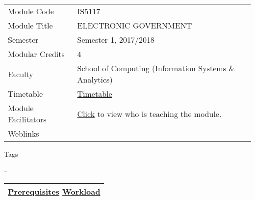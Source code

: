 \hypertarget{ctl00_ctl00_ContentPlaceHolder1_ContentPlaceHolder1_LV_itemPlaceholderContainer}{}
\begin{longtable}[]{@{}ll@{}}
\toprule
\protect\hypertarget{ctl00_ctl00_ContentPlaceHolder1_ContentPlaceHolder1_LV_ctrl0_txtCode}{}{Module
Code} &
\protect\hypertarget{ctl00_ctl00_ContentPlaceHolder1_ContentPlaceHolder1_LV_ctrl0_lcCode}{}{IS5117}\tabularnewline
\protect\hypertarget{ctl00_ctl00_ContentPlaceHolder1_ContentPlaceHolder1_LV_ctrl0_lcCourse}{}{Module
Title} &
\protect\hypertarget{ctl00_ctl00_ContentPlaceHolder1_ContentPlaceHolder1_LV_ctrl0_lcCourseName}{}{ELECTRONIC
GOVERNMENT}\tabularnewline
\protect\hypertarget{ctl00_ctl00_ContentPlaceHolder1_ContentPlaceHolder1_LV_ctrl0_lcSemester}{}{Semester}
&
\protect\hypertarget{ctl00_ctl00_ContentPlaceHolder1_ContentPlaceHolder1_LV_ctrl0_lcSem}{}{Semester
1, 2017/2018}\tabularnewline
\protect\hypertarget{ctl00_ctl00_ContentPlaceHolder1_ContentPlaceHolder1_LV_ctrl0_lcModCredit}{}{Modular
Credits} &
\protect\hypertarget{ctl00_ctl00_ContentPlaceHolder1_ContentPlaceHolder1_LV_ctrl0_lcModC}{}{4}\tabularnewline
\protect\hypertarget{ctl00_ctl00_ContentPlaceHolder1_ContentPlaceHolder1_LV_ctrl0_lcFaculty}{}{Faculty}
&
\protect\hypertarget{ctl00_ctl00_ContentPlaceHolder1_ContentPlaceHolder1_LV_ctrl0_lcFac}{}{School
of Computing (Information Systems \& Analytics)}\tabularnewline
\protect\hypertarget{ctl00_ctl00_ContentPlaceHolder1_ContentPlaceHolder1_LV_ctrl0_Label1}{}{Timetable}
&
\protect\hypertarget{ctl00_ctl00_ContentPlaceHolder1_ContentPlaceHolder1_LV_ctrl0_Span1}{}{\href{javascript:void(0);}{Timetable}}\tabularnewline
\protect\hypertarget{ctl00_ctl00_ContentPlaceHolder1_ContentPlaceHolder1_LV_ctrl0_Label6}{}{Module
Facilitators} &
\protect\hypertarget{ctl00_ctl00_ContentPlaceHolder1_ContentPlaceHolder1_LV_ctrl0_Span2}{}{\href{list_lecturers.aspx?CourseID=c2566e96-8849-42a1-b6e8-36ec6e45867b\&ClickFrom=}{Click}
to view who is teaching the module.}\tabularnewline
\protect\hypertarget{ctl00_ctl00_ContentPlaceHolder1_ContentPlaceHolder1_LV_ctrl0_LabelCtrl1}{}{Weblinks}
&\tabularnewline
\bottomrule
\end{longtable}

\protect\hypertarget{ctl00_ctl00_ContentPlaceHolder1_ContentPlaceHolder1_LV_ctrl0_Label4}{}{Tags}

\protect\hypertarget{ctl00_ctl00_ContentPlaceHolder1_ContentPlaceHolder1_LV_ctrl0_lblTags}{}{--}

\begin{longtable}[]{@{}l@{}}
\toprule
\protect\hypertarget{ctl00_ctl00_ContentPlaceHolder1_ContentPlaceHolder1_lblSectionMiddle}{}{\protect\hyperlink{Prerequisites}{Prerequisites}
\textbar{} \protect\hyperlink{Workload}{Workload}}\tabularnewline
\bottomrule
\end{longtable}


